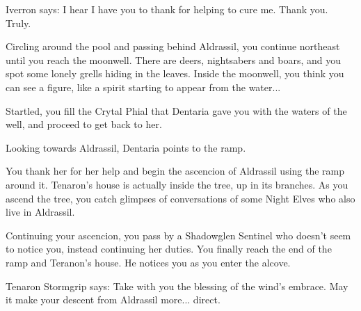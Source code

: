 Iverron says: I hear I have you to thank for helping to cure me. Thank you. Truly.




Circling around the pool and passing behind Aldrassil, you continue northeast until you reach the moonwell. There are deers, nightsabers and boars, and you spot some lonely grells hiding in the leaves. Inside the moonwell, you think you can see a figure, like a spirit starting to appear from the water...


Startled, you fill the Crytal Phial that Dentaria gave you with the waters of the well, and proceed to get back to her.




Looking towards Aldrassil, Dentaria points to the ramp.


You thank her for her help and begin the ascencion of Aldrassil using the ramp around it. Tenaron's house is actually inside the tree, up in its branches. As you ascend the tree, you catch glimpses of conversations of some Night Elves who also live in Aldrassil.


Continuing your ascencion, you pass by a Shadowglen Sentinel who doesn't seem to notice you, instead continuing her duties. You finally reach the end of the ramp and Teranon's house. He notices you as you enter the alcove.





Tenaron Stormgrip says: Take with you the blessing of the wind's embrace. May it make your descent from Aldrassil more... direct.

